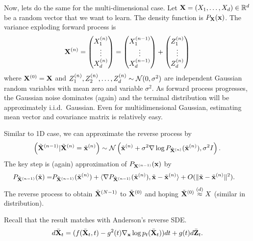 \documentclass[11pt]{article}
\begin{document}
Now, lets do the same for the multi-dimensional case.
Let ${\bf X}=(X_1, \dots, X_d)\in\mathbb{R}^d$ be a random vector that we want to learn.
The density function is $P_{{\bf X}}({\bf x})$.
The variance exploding forward process is 
\begin{align}
    {\bf X}^{(n)} = \begin{pmatrix} X^{(n)}_1 \\ \vdots\\X^{(n)}_d \end{pmatrix}
    = \begin{pmatrix} X^{(n-1)}_1 \\ \vdots\\X^{(n-1)}_d \end{pmatrix}
    + \begin{pmatrix} Z^{(n)}_1 \\ \vdots \\ Z^{(n)}_d \end{pmatrix}
\end{align}
where ${\bf X}^{(0)} = {\bf X}$ and $Z^{(n)}_1, Z^{(n)}_2, \dots, Z^{(n)}_d\sim{\cal N}(0, \sigma^2)$ are independent Gaussian random variables 
with mean zero and variable $\sigma^2$.
As forward process progresses, the Gaussian noise dominates (again) and the terminal distribution will be approximately i.i.d.~Gaussian.
Even for multidimensional Gaussian, estimating mean vector and covariance matrix is relatively easy.


Similar to 1D case, we can approximate the reverse process by
\begin{align}
    \left(\tilde{{\bf X}}^{(n-1)} | \tilde{{\bf X}}^{(n)}=\tilde{{\bf x}}^{(n)} \right)\sim {\cal N}\left(\tilde{{\bf x}}^{(n)} + \sigma^2 \nabla \log P_{\tilde{{\bf X}}^{(n)}}(\tilde{{\bf x}}^{(n)}), \sigma^2 I\right).
\end{align}
The key step is (again) approximation of $P_{{\bf X}^{(n-1)}}({\bf x})$ by 
\begin{align}
    P_{\tilde{{\bf X}}^{(n-1)}}(\tilde{{\bf x}}) =& P_{\tilde{{\bf X}}^{(n-1)}}(\tilde{{\bf x}}^{(n)}) + \langle \nabla P_{\tilde{{\bf X}}^{(n-1)}}(\tilde{{\bf x}}^{(n)}), \tilde{{\bf x}}-\tilde{{\bf x}}^{(n)}\rangle + O(\|\tilde{{\bf x}}-\tilde{{\bf x}}^{(n)}\|^2).
\end{align}
The reverse process to obtain $\tilde{{\bf X}}^{(N-1)}$ to $\tilde{{\bf X}}^{(0)}$ 
and hoping $\tilde{{\bf X}}^{(0)} \stackrel{(d)}{\approx} X$ (similar in distribution).

Recall that the result matches with Anderson's reverse SDE.
\begin{align}
    d\bar{{\bf X}}_t = (f(\bar{{\bf X}}_t, t) - g^2(t) \nabla_{{\bf x}}\log p_t(\bar{{\bf X}}_t))dt+g(t) d\bar{{\bf Z}}_t.
\end{align}
\end{document}
